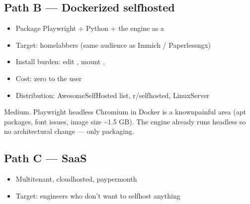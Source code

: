 \documentclass[a4paper,11pt,english]{sphinxmanual}
\begin{document}
\subsection{Path B — Dockerized self\sphinxhyphen{}hosted}
\label{\detokenize{analysis:path-b-dockerized-self-hosted}}\begin{itemize}
\item {} 
\sphinxAtStartPar
Package Playwright + Python + the engine as a 

\item {} 
\sphinxAtStartPar
Target: homelabbers (same audience as Immich / Paperless\sphinxhyphen{}ngx)

\item {} 
\sphinxAtStartPar
Install burden: edit , mount , 

\item {} 
\sphinxAtStartPar
Cost: zero to the user

\item {} 
\sphinxAtStartPar
Distribution: AwesomeSelfHosted list, r/selfhosted, LinuxServer

\end{itemize}

\sphinxAtStartPar
{} Medium. Playwright headless Chromium in Docker is a
known\sphinxhyphen{}painful area (apt packages, font issues, image size \textasciitilde{}1.5 GB).
The engine already runs headless so no architectural change — only
packaging.


\subsection{Path C — SaaS}
\label{\detokenize{analysis:path-c-saas}}\begin{itemize}
\item {} 
\sphinxAtStartPar
Multi\sphinxhyphen{}tenant, cloud\sphinxhyphen{}hosted, pay\sphinxhyphen{}per\sphinxhyphen{}month

\item {} 
\sphinxAtStartPar
Target: engineers who don’t want to self\sphinxhyphen{}host anything

\end{itemize}
\end{document}
